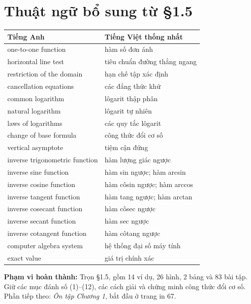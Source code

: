 \documentclass[12pt,a4paper]{article}
\begin{document}
\section*{Thuật ngữ bổ sung từ §1.5}
\begingroup\small
\begin{longtable}{p{.43\linewidth}p{.49\linewidth}}\toprule Tiếng Anh&Tiếng Việt thống nhất\\\midrule\endhead
one-to-one function&hàm số đơn ánh\\
horizontal line test&tiêu chuẩn đường thẳng ngang\\
restriction of the domain&hạn chế tập xác định\\
cancellation equations&các đẳng thức khử\\
common logarithm&lôgarit thập phân\\
natural logarithm&lôgarit tự nhiên\\
laws of logarithms&các quy tắc lôgarit\\
change of base formula&công thức đổi cơ số\\
vertical asymptote&tiệm cận đứng\\
inverse trigonometric function&hàm lượng giác ngược\\
inverse sine function&hàm sin ngược; hàm arcsin\\
inverse cosine function&hàm côsin ngược; hàm arccos\\
inverse tangent function&hàm tang ngược; hàm arctan\\
inverse cosecant function&hàm côsec ngược\\
inverse secant function&hàm sec ngược\\
inverse cotangent function&hàm côtang ngược\\
computer algebra system&hệ thống đại số máy tính\\
exact value&giá trị chính xác\\
\bottomrule\end{longtable}
\endgroup
\noindent\textbf{Phạm vi hoàn thành:} Trọn §1.5, gồm 14 ví dụ, 26 hình, 2 bảng và 83 bài tập. Giữ các mục đánh số (1)–(12), các cách giải và chứng minh công thức đổi cơ số. Phần tiếp theo: \textit{Ôn tập Chương 1}, bắt đầu ở trang in 67.
\end{document}
